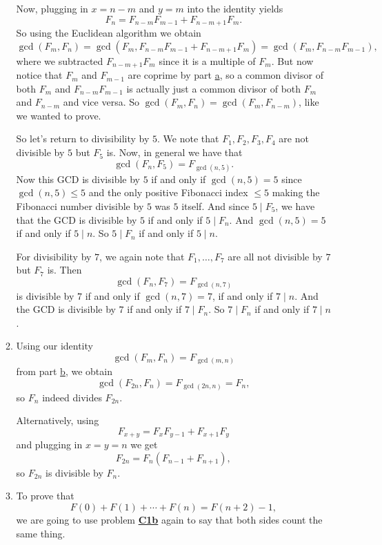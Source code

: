 \documentclass[11pt]{scrartcl}
\begin{document}
\begin{enumerate}[label=\textbf{N\arabic*}.]
\begin{enumerate}
       Now, plugging in $x = n-m$ and $y = m$ into the identity yields
       \[
         F_{n} = F_{n-m} F_{m-1} + F_{n-m+1} F_{m}.
       \]
       So using the Euclidean algorithm we obtain
       \[
         \gcd(F_m, F_n) = \gcd(F_m, F_{n-m} F_{m-1} + F_{n-m+1} F_{m}) = \gcd(F_m, F_{n-m} F_{m-1}),
       \]
       where we subtracted $F_{n-m+1} F_{m}$ since it is a multiple of $F_m$. But now notice that $F_m$ and $F_{m-1}$ are coprime by part \hyperref[N1a]{a}, so a common divisor of both $F_m$ and $F_{n-m} F_{m-1}$ is actually just a common divisor of both $F_m$ and $F_{n-m}$ and vice versa. So $\gcd(F_m, F_n) = \gcd(F_m, F_{n-m})$, like we wanted to prove.
       
       So let's return to divisibility by $5$. We note that $F_1, F_2, F_3, F_4$ are not divisible by $5$ but $F_5$ is. Now, in general we have that
       \[
         \gcd(F_n, F_5) = F_{\gcd(n, 5)}.
       \]
       Now this GCD is divisible by $5$ if and only if $\gcd(n, 5) = 5$ since $\gcd(n,5) \le 5$ and the only positive Fibonacci index $\le 5$ making the Fibonacci number divisible by $5$ was $5$ itself. And since $5 \mid F_5$, we have that the GCD is divisible by $5$ if and only if $5 \mid F_n$. And $\gcd(n,5) = 5$ if and only if $5 \mid n$. So $5 \mid F_n$ if and only if $5 \mid n$.
       
       For divisibility by $7$, we again note that $F_1, \ldots, F_7$ are all not divisible by $7$ but $F_7$ is. Then
       \[
         \gcd(F_n, F_7) = F_{\gcd(n, 7)}
       \]
       is divisible by $7$ if and only if $\gcd(n,7) = 7$, if and only if $7 \mid n$. And the GCD is divisible by $7$ if and only if $7 \mid F_n$. So $7 \mid F_n$ if and only if $7 \mid n$. \label{N1b}
      
      \item Using our identity
      \[
         \gcd(F_m, F_n) = F_{\gcd(m,n)}
       \] 
       from part \hyperref[N1b]{b}, we obtain 
       \[
         \gcd(F_{2n}, F_n) = F_{\gcd(2n,n)} = F_n,
       \] 
       so $F_n$ indeed divides $F_{2n}$.
       
       Alternatively, using 
       \[
         F_{x+y} = F_{x} F_{y-1} + F_{x+1} F_y
       \]
       and plugging in $x = y = n$ we get \[ F_{2n} = F_n(F_{n-1} + F_{n+1}), \] so $F_{2n}$ is divisible by $F_n$.
     
     \item To prove that
     \[
       F(0) + F(1) + \cdots + F(n) = F(n+2) - 1,
     \]
     we are going to use problem \textbf{\hyperref[C1b]{C1b}} again to say that both sides count the same thing.
     

\end{enumerate}
\end{enumerate}
\end{document}
